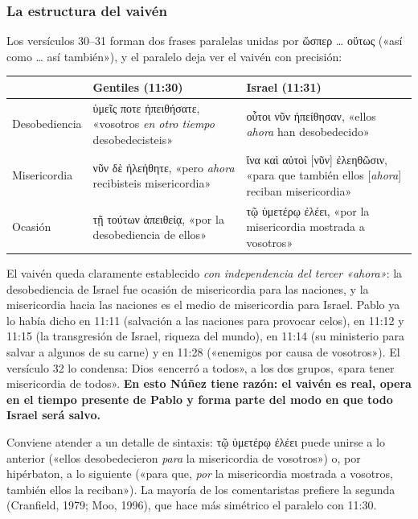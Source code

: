 \documentclass[11pt,letterpaper]{article}
\newcommand{\grc}[1]{\foreignlanguage{ancientgreek}{#1}}
\newcommand{\destacar}[1]{\textbf{\textcolor{ladrillo}{#1}}}
\begin{document}
\subsubsection*{La estructura del vaivén}

Los versículos 30--31 forman dos frases paralelas unidas por \grc{ὥσπερ … οὕτως} («así como \ldots{} así también»), y el paralelo deja ver el vaivén con precisión:

\begin{center}\footnotesize
\renewcommand{\arraystretch}{1.3}
\begin{tabular}{>{\RaggedRight\arraybackslash}p{2.6cm}>{\RaggedRight\arraybackslash}p{5.5cm}>{\RaggedRight\arraybackslash}p{5.7cm}}
\toprule
 & \textbf{Gentiles (11:30)} & \textbf{Israel (11:31)}\\
\midrule
Desobediencia & \grc{ὑμεῖς \textcolor{ladrillo}{ποτε} ἠπειθήσατε}, «vosotros \emph{en otro tiempo} desobedecisteis» & \grc{οὗτοι \textcolor{ladrillo}{νῦν} ἠπείθησαν}, «ellos \emph{ahora} han desobedecido»\\
Misericordia & \grc{\textcolor{ladrillo}{νῦν} δὲ ἠλεήθητε}, «pero \emph{ahora} recibisteis misericordia» & \grc{ἵνα καὶ αὐτοὶ \textcolor{ladrillo}{[νῦν]} ἐλεηθῶσιν}, «para que también ellos [\emph{ahora}] reciban misericordia»\\
Ocasión & \grc{τῇ τούτων ἀπειθείᾳ}, «por la desobediencia de ellos» & \grc{τῷ ὑμετέρῳ ἐλέει}, «por la misericordia mostrada a vosotros»\\
\bottomrule
\end{tabular}\end{center}

El vaivén queda claramente establecido \emph{con independencia del tercer «ahora»}: la desobediencia de Israel fue ocasión de misericordia para las naciones, y la misericordia hacia las naciones es el medio de misericordia para Israel. Pablo ya lo había dicho en 11:11 (salvación a las naciones para provocar celos), en 11:12 y 11:15 (la transgresión de Israel, riqueza del mundo), en 11:14 (su ministerio para salvar a algunos de su carne) y en 11:28 («enemigos por causa de vosotros»). El versículo 32 lo condensa: Dios «encerró a todos», a los dos grupos, «para tener misericordia de todos». \destacar{En esto Núñez tiene razón: el vaivén es real, opera en el tiempo presente de Pablo y forma parte del modo en que todo Israel será salvo.}

Conviene atender a un detalle de sintaxis: \grc{τῷ ὑμετέρῳ ἐλέει} puede unirse a lo anterior («ellos desobedecieron \emph{para} la misericordia de vosotros») o, por hipérbaton, a lo siguiente («para que, \emph{por} la misericordia mostrada a vosotros, también ellos la reciban»). La mayoría de los comentaristas prefiere la segunda (Cranfield, 1979; Moo, 1996), que hace más simétrico el paralelo con 11:30.
\end{document}
